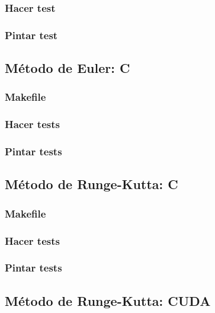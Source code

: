 \subsubsection{Hacer test}

\newpage

\subsubsection{Pintar test}

\newpage

\subsection{Método de Euler: C}

\newpage

\subsubsection{Makefile}

\newpage

\subsubsection{Hacer tests}

\newpage

\subsubsection{Pintar tests}

\newpage

\subsection{Método de Runge-Kutta: C}

\newpage

\subsubsection{Makefile}

\newpage

\subsubsection{Hacer tests}

\newpage

\subsubsection{Pintar tests}

\newpage

\subsection{Método de Runge-Kutta: CUDA}
\label{prueba:cuda}
